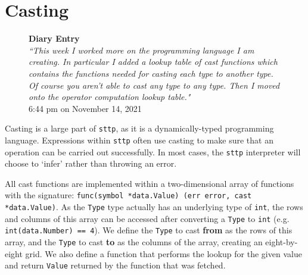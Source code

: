 \section{Casting}
\label{sec:development-casting}

\begin{figure}[H]
    \begin{center}
        \textbf{Diary Entry}\\[0.5em]
        \textit{``This week I worked more on the programming language I am creating. In particular I added a lookup table of cast functions which contains the functions needed for casting each type to another type. Of course you aren’t able to cast any type to any type. Then I moved onto the operator computation lookup table."}\\[0.5em]
        \tiny{6:44 pm on November 14, 2021}
    \end{center}
\end{figure}

Casting is a large part of \verb|sttp|, as it is a dynamically-typed programming language. Expressions within \verb|sttp| often use casting to make sure that an operation can be carried out successfully. In most cases, the \verb|sttp| interpreter will choose to `infer' rather than throwing an error.

All cast functions are implemented within a two-dimensional array of functions with the signature: \texttt{func(symbol *data.Value) (err error, cast *data.Value)}. As the \verb|Type| type actually has an underlying type of \texttt{int}, the rows and columns of this array can be accessed after converting a \verb|Type| to \texttt{int} (e.g. \texttt{int(data.Number) == 4}). We define the \verb|Type| to cast \textbf{from} as the rows of this array, and the \verb|Type| to cast \textbf{to} as the columns of the array, creating an eight-by-eight grid. We also define a function that performs the lookup for the given value and return \verb|Value| returned by the function that was fetched.

\inputminted[firstline=26, lastline=43, autogobble, breaklines, tabsize=4]{go}{../../src/eval/casting.go}

